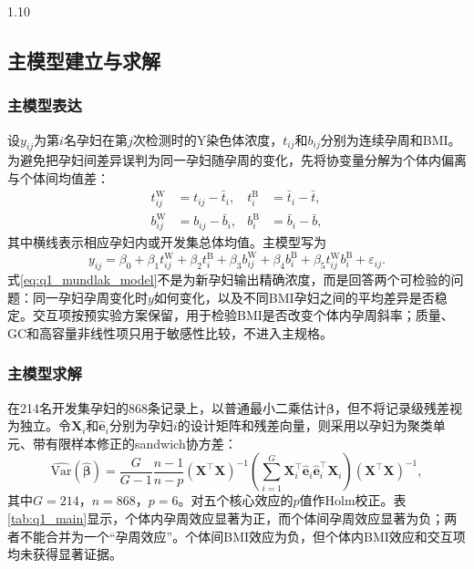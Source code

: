 \documentclass[12pt,a4paper]{ctexrep}
\numberwithin{equation}{section}
\begin{document}
\begin{spacing}{1.10}
{			\subsection{主模型建立与求解}
			\subsubsection{主模型表达}
			设$y_{ij}$为第$i$名孕妇在第$j$次检测时的Y染色体浓度，$t_{ij}$和$b_{ij}$分别为连续孕周和BMI。为避免把孕妇间差异误判为同一孕妇随孕周的变化，先将协变量分解为个体内偏离与个体间均值差：
			\begin{equation}
			\begin{aligned}
			t^{\mathrm W}_{ij}&=t_{ij}-\bar t_i, &
			t^{\mathrm B}_{i}&=\bar t_i-\bar t,\\
			b^{\mathrm W}_{ij}&=b_{ij}-\bar b_i, &
			b^{\mathrm B}_{i}&=\bar b_i-\bar b,
			\end{aligned}
			\label{eq:q1_mundlak_decompose}
			\end{equation}
			其中横线表示相应孕妇内或开发集总体均值。主模型写为
			\begin{equation}
			y_{ij}=\beta_0+\beta_1t^{\mathrm W}_{ij}+\beta_2t^{\mathrm B}_{i}
			+\beta_3b^{\mathrm W}_{ij}+\beta_4b^{\mathrm B}_{i}
			+\beta_5t^{\mathrm W}_{ij}b^{\mathrm B}_{i}+\varepsilon_{ij}.
			\label{eq:q1_mundlak_model}
			\end{equation}
			式\eqref{eq:q1_mundlak_model}不是为新孕妇输出精确浓度，而是回答两个可检验的问题：同一孕妇孕周变化时$y$如何变化，以及不同BMI孕妇之间的平均差异是否稳定。交互项按预实验方案保留，用于检验BMI是否改变个体内孕周斜率；质量、GC和高容量非线性项只用于敏感性比较，不进入主规格。
			\subsubsection{主模型求解}
			在214名开发集孕妇的868条记录上，以普通最小二乘估计$\boldsymbol\beta$，但不将记录级残差视为独立。令$\boldsymbol X_i$和$\widehat{\boldsymbol e}_i$分别为孕妇$i$的设计矩阵和残差向量，则采用以孕妇为聚类单元、带有限样本修正的sandwich协方差：
			\begin{equation}
			\widehat{\mathrm{Var}}(\widehat{\boldsymbol\beta})
			=\frac{G}{G-1}\frac{n-1}{n-p}
			(\boldsymbol X^\top\boldsymbol X)^{-1}
			\left(\sum_{i=1}^{G}\boldsymbol X_i^\top\widehat{\boldsymbol e}_i
			\widehat{\boldsymbol e}_i^\top\boldsymbol X_i\right)
			(\boldsymbol X^\top\boldsymbol X)^{-1},
			\label{eq:q1_cluster_cov}
			\end{equation}
			其中$G=214$，$n=868$，$p=6$。对五个核心效应的$p$值作Holm校正。表\ref{tab:q1_main}显示，个体内孕周效应显著为正，而个体间孕周效应显著为负；两者不能合并为一个``孕周效应''。个体间BMI效应为负，但个体内BMI效应和交互项均未获得显著证据。

}
\end{spacing}
\end{document}
